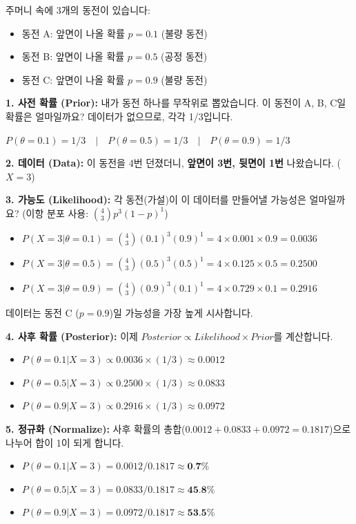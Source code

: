 \documentclass[11pt,a4paper]{book}
\theoremstyle{definition}
\begin{document}
\begin{examplebox}[title={동전 뒤집기 예제 (이산 확률)}]
    주머니 속에 3개의 동전이 있습니다:
    \begin{itemize}
        \item 동전 A: 앞면이 나올 확률 $p=0.1$ (불량 동전)
        \item 동전 B: 앞면이 나올 확률 $p=0.5$ (공정 동전)
        \item 동전 C: 앞면이 나올 확률 $p=0.9$ (불량 동전)
    \end{itemize}
    
    \textbf{1. 사전 확률 (Prior):}
    내가 동전 하나를 무작위로 뽑았습니다. 이 동전이 A, B, C일 확률은 얼마일까요?
    데이터가 없으므로, 각각 1/3입니다.
    
    $P(\theta=0.1) = 1/3 \quad | \quad P(\theta=0.5) = 1/3 \quad | \quad P(\theta=0.9) = 1/3$
    
    \textbf{2. 데이터 (Data):}
    이 동전을 4번 던졌더니, \textbf{앞면이 3번, 뒷면이 1번} 나왔습니다. ($X=3$)
    
    \textbf{3. 가능도 (Likelihood):}
    각 동전(가설)이 이 데이터를 만들어낼 가능성은 얼마일까요? (이항 분포 사용: $\binom{4}{3} p^3 (1-p)^1$)
    \begin{itemize}
        \item $P(X=3 | \theta=0.1) = \binom{4}{3} (0.1)^3 (0.9)^1 = 4 \times 0.001 \times 0.9 = 0.0036$
        \item $P(X=3 | \theta=0.5) = \binom{4}{3} (0.5)^3 (0.5)^1 = 4 \times 0.125 \times 0.5 = 0.2500$
        \item $P(X=3 | \theta=0.9) = \binom{4}{3} (0.9)^3 (0.1)^1 = 4 \times 0.729 \times 0.1 = 0.2916$
    \end{itemize}
    데이터는 동전 C ($p=0.9$)일 가능성을 가장 높게 시사합니다.
    
    \textbf{4. 사후 확률 (Posterior):}
    이제 $Posterior \propto Likelihood \times Prior$를 계산합니다.
    \begin{itemize}
        \item $P(\theta=0.1 | X=3) \propto 0.0036 \times (1/3) \approx 0.0012$
        \item $P(\theta=0.5 | X=3) \propto 0.2500 \times (1/3) \approx 0.0833$
        \item $P(\theta=0.9 | X=3) \propto 0.2916 \times (1/3) \approx 0.0972$
    \end{itemize}
    
    \textbf{5. 정규화 (Normalize):}
    사후 확률의 총합($0.0012 + 0.0833 + 0.0972 = 0.1817$)으로 나누어 합이 1이 되게 합니다.
    \begin{itemize}
        \item $P(\theta=0.1 | X=3) = 0.0012 / 0.1817 \approx \textbf{0.7\%}$
        \item $P(\theta=0.5 | X=3) = 0.0833 / 0.1817 \approx \textbf{45.8\%}$
        \item $P(\theta=0.9 | X=3) = 0.0972 / 0.1817 \approx \textbf{53.5\%}$
    \end{itemize}
    

\end{examplebox}
\end{document}
